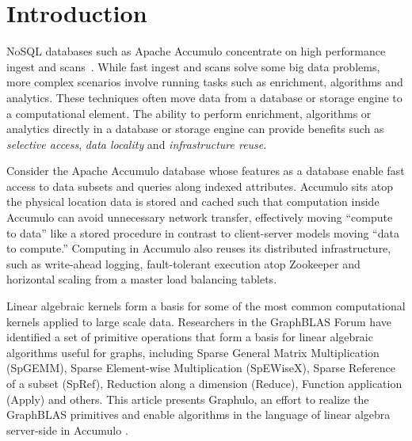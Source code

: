 
\section{Introduction}
\label{sIntro}
% 


NoSQL databases such as Apache Accumulo
concentrate on high performance ingest and scans~\cite{sen2013benchmarking}. 
While fast ingest and scans solve some big data problems,
more complex scenarios involve running tasks
such as enrichment, algorithms and analytics. These techniques
often move data from a database or storage engine to a
computational element. The ability to
perform enrichment, algorithms or analytics directly in a database or
storage engine can provide benefits such as \emph{selective access},
\emph{data locality} and \emph{infrastructure reuse}. 

Consider the Apache Accumulo database whose features as a database enable
fast access to data subsets and queries along indexed attributes. 
Accumulo sits atop the physical location data is stored and cached
such that computation inside Accumulo can avoid unnecessary network transfer,
effectively moving ``compute to data'' like a stored procedure
in contrast to client-server models moving ``data to compute.''
Computing in Accumulo also reuses its distributed infrastructure, 
such as write-ahead logging, fault-tolerant execution atop Zookeeper and 
horizontal scaling from a master load balancing tablets.

Linear algebraic kernels form a basis for some of the most common
computational kernels applied to large scale data. 
Researchers in the GraphBLAS Forum \cite{mattson2014standards} have identified a set of primitive operations 
that form a basis for linear algebraic algorithms useful for graphs, including 
Sparse General Matrix Multiplication (SpGEMM),  Sparse Element-wise Multiplication (SpEWiseX),
Sparse Reference of a subset (SpRef), Reduction along a dimension (Reduce),
Function application (Apply) and others.
This article presents Graphulo, an effort to realize the GraphBLAS primitives 
and enable algorithms in the language of linear algebra server-side in Accumulo \cite{gadepally2015gabb}.

